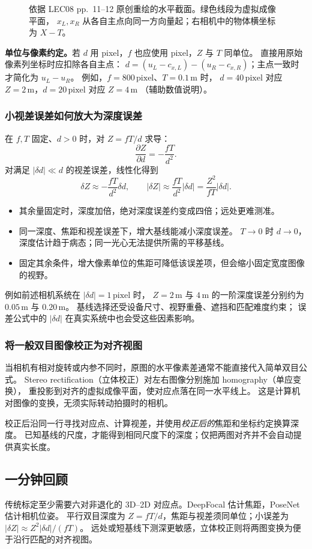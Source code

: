 \begin{figure}[htbp]
  \centering
  
  \caption{依据 LEC08 pp.~11--12 原创重绘的水平截面。绿色线段为虚拟成像平面，
  $x_L,x_R$ 从各自主点向同一方向量起；右相机中的物体横坐标为 $X-T$。}
  \label{fig:sc4061-l12-stereo}
\end{figure}

\textbf{单位与像素约定。}若 $d$ 用 pixel，$f$ 也应使用 pixel，$Z$ 与 $T$ 同单位。
直接用原始像素列坐标时应扣除各自主点：
$d=(u_L-c_{x,L})-(u_R-c_{x,R})$；主点一致时才简化为 $u_L-u_R$。
例如，$f=800\,\mathrm{pixel}$、$T=0.1\,\mathrm m$ 时，
$d=40\,\mathrm{pixel}$ 对应 $Z=2\,\mathrm m$，$d=20\,\mathrm{pixel}$ 对应 $Z=4\,\mathrm m$
（辅助数值说明）。


\subsubsection*{小视差误差如何放大为深度误差}

在 $f,T$ 固定、$d>0$ 时，对 $Z=fT/d$ 求导：
\[
  \frac{\partial Z}{\partial d}=-\frac{fT}{d^2}.
\]
对满足 $|\delta d|\ll d$ 的视差误差，线性化得到
\[
  \delta Z\approx-\frac{fT}{d^2}\delta d,
  \qquad
  |\delta Z|\approx\frac{fT}{d^2}|\delta d|
  =\boxed{\frac{Z^2}{fT}|\delta d|}.
\]
\begin{itemize}
  \item 其余量固定时，深度加倍，绝对深度误差约变成四倍；远处更难测准。
  \item 同一深度、焦距和视差误差下，增大基线能减小深度误差。
    $T\to0$ 时 $d\to0$，深度估计趋于病态；同一光心无法提供所需的平移基线。
  \item 固定其余条件，增大像素单位的焦距可降低该误差项，但会缩小固定宽度图像的视野。
\end{itemize}
例如前述相机系统在 $|\delta d|=1\,\mathrm{pixel}$ 时，
$Z=2\,\mathrm m$ 与 $4\,\mathrm m$ 的一阶深度误差分别约为 $0.05\,\mathrm m$ 与 $0.20\,\mathrm m$。
基线选择还受设备尺寸、视野重叠、遮挡和匹配难度约束；
误差公式中的 $|\delta d|$ 在真实系统中也会受这些因素影响。

\subsubsection*{将一般双目图像校正为对齐视图}

当相机有相对旋转或内参不同时，原图的水平像素差通常不能直接代入简单双目公式。
Stereo rectification（立体校正）对左右图像分别施加 homography（单应变换），
重投影到对齐的虚拟成像平面，使对应点落在同一水平线上。
这是计算机对图像的变换，无须实际转动拍摄时的相机。

校正后沿同一行寻找对应点、计算视差，并使用\emph{校正后的}焦距和坐标约定换算深度。
已知基线的尺度，才能得到相同尺度下的深度；仅把两图对齐并不会自动提供真实长度。

\subsection{一分钟回顾}

传统标定至少需要六对非退化的 3D--2D 对应点。DeepFocal 估计焦距，PoseNet 估计相机位姿。
平行双目深度为 $Z=fT/d$，焦距与视差须同单位；小误差为 $|\delta Z|\approx Z^2|\delta d|/(fT)$。
远处或短基线下测深更敏感，立体校正则将两图变换为便于沿行匹配的对齐视图。
